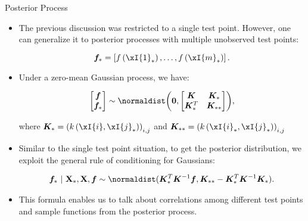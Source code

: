 \begin{frame}[c,allowframebreaks]{Posterior Process}

\begin{itemize}
\item The previous discussion was restricted to a single test point. However, one can generalize it to posterior processes with multiple unobserved test points:
  
$$\bm{f}_* = \left[f\left(\xI{1}_*\right),\dots, f\left(\xI{m}_*\right)\right].$$ 


\lz

\item Under a zero-mean Gaussian process, we have:

$$\begin{bmatrix}\bm{f} \\
\bm{f}_*\end{bmatrix}\sim  
\normaldist\biggl(\bm{0}, \begin{bmatrix} \bm{K} & \bm{K}_* \\ \bm{K}_*^T & \bm{K}_{**}\end{bmatrix}\biggr),$$

where $\bm{K}_* = \left(k\left(\xI{i}, \xI{j}_*\right)\right)_{i,j}$ and $\bm{K}_{**} = \left(k\left(\xI{i}_*, \xI{j}_*\right)\right)_{i,j}$ 

\end{itemize}

\framebreak

\begin{itemize}

  \item Similar to the single test point situation, to get the posterior distribution, we exploit the general rule of conditioning for Gaussians:
  
  \begin{eqnarray*}
    \bm{f}_* ~|~ \Xmat_*, \Xmat, \bm{f} \sim \normaldist(\Kmat_{*}^{T}\Kmat^{-1}\bm{f}, \Kmat_{**} - \Kmat_*^T \Kmat ^{-1}\Kmat_*).
  \end{eqnarray*}  
  
\lz

  \item This formula enables us to talk about correlations among different test points and sample functions from the posterior process. 
\end{itemize}


\end{frame}

